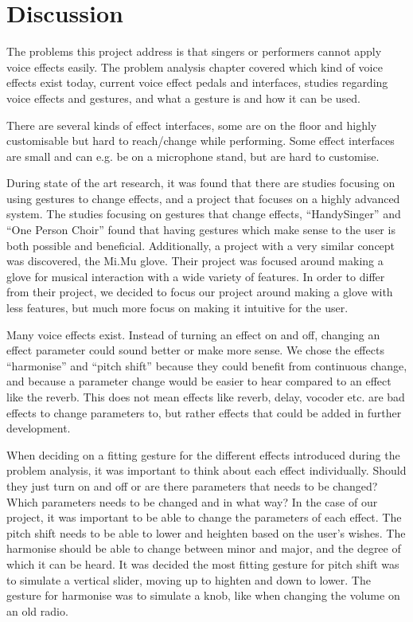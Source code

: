 \chapter{Discussion}
The problems this project address is that singers or performers cannot apply voice effects easily. The problem analysis chapter covered which kind of voice effects exist today, current voice effect pedals and interfaces, studies regarding voice effects and gestures, and what a gesture is and how it can be used.

There are several kinds of effect interfaces, some are on the floor and highly customisable but hard to reach/change while performing. Some effect interfaces are small and can e.g. be on a microphone stand, but are hard to customise. 

During state of the art research, it was found that there are studies focusing on using gestures to change effects, and a project that focuses on a highly advanced system. 
The studies focusing on gestures that change effects, “HandySinger” and “One Person Choir” found that having gestures which make sense to the user is both possible and beneficial. Additionally, a project with a very similar concept was discovered, the Mi.Mu glove. Their project was focused around making a glove for musical interaction with a wide variety of features. In order to differ from their project, we decided to focus our project around making a glove with less features, but much more focus on making it intuitive for the user.

Many voice effects exist. Instead of turning an effect on and off, changing an effect parameter could sound better or make more sense. We chose the effects “harmonise” and “pitch shift” because they could benefit from continuous change, and because a parameter change would be easier to hear compared to an effect like the reverb. This does not mean effects like reverb, delay, vocoder etc. are bad effects to change parameters to, but rather effects that could be added in further development.

When deciding on a fitting gesture for the different effects introduced during the problem analysis, it was important to think about each effect individually. Should they just turn on and off or are there parameters that needs to be changed? Which parameters needs to be changed and in what way?
In the case of our project, it was important to be able to change the parameters of each effect. The pitch shift needs to be able to lower and heighten based on the user's wishes. The harmonise should be able to change between minor and major, and the degree of which it can be heard. It was decided the most fitting gesture for pitch shift was to simulate a vertical slider, moving up to highten and down to lower. The gesture for harmonise was to simulate a knob, like when changing the volume on an old radio.

